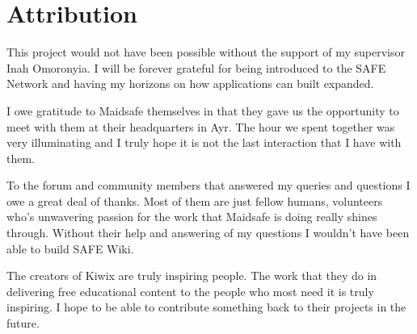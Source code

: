 \section{Attribution}

This project would not have been possible without the support of my supervisor Inah Omoronyia. I will be forever grateful for being introduced to the SAFE Network and having my horizons on how applications can built expanded.

I owe gratitude to Maidsafe themselves in that they gave us the opportunity to meet with them at their headquarters in Ayr. The hour we spent together was very illuminating and I truly hope it is not the last interaction that I have with them.

To the forum and community members that answered my queries and questions I owe a great deal of thanks. Most of them are just fellow humans, volunteers who's unwavering passion for the work that Maidsafe is doing really shines through. Without their help and answering of my questions I wouldn't have been able to build SAFE Wiki.

The creators of Kiwix are truly inspiring people. The work that they do in delivering free educational content to the people who most need it is truly inspiring. I hope to be able to contribute something back to their projects in the future. 
